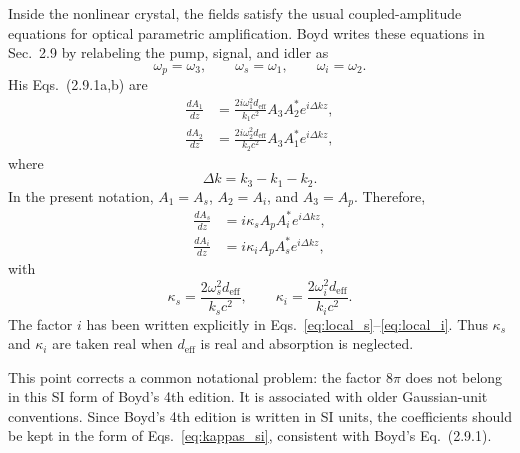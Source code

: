 \begin{resolucao}[Solution]
    Inside the nonlinear crystal, the fields satisfy the usual coupled-amplitude equations for optical parametric amplification. Boyd writes these equations in Sec.~2.9 by relabeling the pump, signal, and idler as
    \begin{equation}
        \omega_p=\omega_3,
        \qquad
        \omega_s=\omega_1,
        \qquad
        \omega_i=\omega_2.
    \end{equation}
    His Eqs.~(2.9.1a,b) are
    \begin{align}
        \frac{dA_1}{dz}
        &=
        \frac{
            2i\omega_1^2 d_{\mathrm{eff}}
        }{
            k_1c^2
        }
        A_3A_2^*
        e^{i\Delta kz},
        \label{eq:boyd_291a_like}
        \\
        \frac{dA_2}{dz}
        &=
        \frac{
            2i\omega_2^2 d_{\mathrm{eff}}
        }{
            k_2c^2
        }
        A_3A_1^*
        e^{i\Delta kz},
        \label{eq:boyd_291b_like}
    \end{align}
    where
    \begin{equation}
        \Delta k
        =
        k_3-k_1-k_2.
        \label{eq:delta_k_opo}
    \end{equation}
    In the present notation, $A_1=A_s$, $A_2=A_i$, and $A_3=A_p$. Therefore,
    \begin{align}
        \frac{dA_s}{dz}
        &=
        i\kappa_s A_pA_i^*e^{i\Delta kz},
        \label{eq:local_s}
        \\
        \frac{dA_i}{dz}
        &=
        i\kappa_i A_pA_s^*e^{i\Delta kz},
        \label{eq:local_i}
    \end{align}
    with
    \begin{equation}
        \kappa_s
        =
        \frac{
            2\omega_s^2 d_{\mathrm{eff}}
        }{
            k_sc^2
        },
        \qquad
        \kappa_i
        =
        \frac{
            2\omega_i^2 d_{\mathrm{eff}}
        }{
            k_ic^2
        }.
        \label{eq:kappas_si}
    \end{equation}
    The factor $i$ has been written explicitly in Eqs.~\eqref{eq:local_s}--\eqref{eq:local_i}. Thus $\kappa_s$ and $\kappa_i$ are taken real when $d_{\mathrm{eff}}$ is real and absorption is neglected.

    This point corrects a common notational problem: the factor $8\pi$ does not belong in this SI form of Boyd's 4th edition. It is associated with older Gaussian-unit conventions. Since Boyd's 4th edition is written in SI units, the coefficients should be kept in the form of Eqs.~\eqref{eq:kappas_si}, consistent with Boyd's Eq.~(2.9.1).


\end{resolucao}

